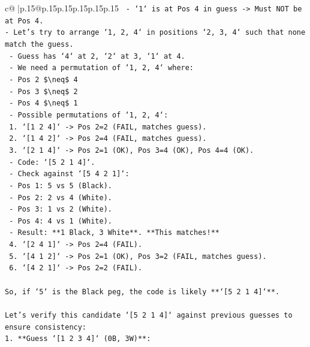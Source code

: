 \documentclass{article}
\begin{document}
{\begin{supertabular}{c@{$\;$}|p{.15\linewidth}@{}p{.15\linewidth}p{.15\linewidth}p{.15\linewidth}p{.15\linewidth}p{.15\linewidth}}
{{{\texttt{    {-} `1` is at Pos 4 in guess {-}> Must NOT be at Pos 4.} \\
\texttt{{-} Let's try to arrange `1, 2, 4` in positions `2, 3, 4` such that none match the guess.} \\
\texttt{    {-} Guess has `4` at 2, `2` at 3, `1` at 4.} \\
\texttt{    {-} We need a permutation of `1, 2, 4` where:} \\
\texttt{        {-} Pos 2 \$\textbackslash{}neq\$ 4} \\
\texttt{        {-} Pos 3 \$\textbackslash{}neq\$ 2} \\
\texttt{        {-} Pos 4 \$\textbackslash{}neq\$ 1} \\
\texttt{    {-} Possible permutations of `1, 2, 4`:} \\
\texttt{        1. `{[}1 2 4{]}` {-}> Pos 2=2 (FAIL, matches guess).} \\
\texttt{        2. `{[}1 4 2{]}` {-}> Pos 2=4 (FAIL, matches guess).} \\
\texttt{        3. `{[}2 1 4{]}` {-}> Pos 2=1 (OK), Pos 3=4 (OK), Pos 4=4 (OK).} \\
\texttt{           {-} Code: `{[}5 2 1 4{]}`.} \\
\texttt{           {-} Check against `{[}5 4 2 1{]}`:} \\
\texttt{             {-} Pos 1: 5 vs 5 (Black).} \\
\texttt{             {-} Pos 2: 2 vs 4 (White).} \\
\texttt{             {-} Pos 3: 1 vs 2 (White).} \\
\texttt{             {-} Pos 4: 4 vs 1 (White).} \\
\texttt{             {-} Result: **1 Black, 3 White**. **This matches!**} \\
\texttt{        4. `{[}2 4 1{]}` {-}> Pos 2=4 (FAIL).} \\
\texttt{        5. `{[}4 1 2{]}` {-}> Pos 2=1 (OK), Pos 3=2 (FAIL, matches guess).} \\
\texttt{        6. `{[}4 2 1{]}` {-}> Pos 2=2 (FAIL).} \\
\\ 
\texttt{So, if `5` is the Black peg, the code is likely **`{[}5 2 1 4{]}`**.} \\
\\ 
\texttt{Let's verify this candidate `{[}5 2 1 4{]}` against previous guesses to ensure consistency:} \\
\texttt{1.  **Guess `{[}1 2 3 4{]}` (0B, 3W)**:} \\
}}}
\end{supertabular}}
\end{document}
